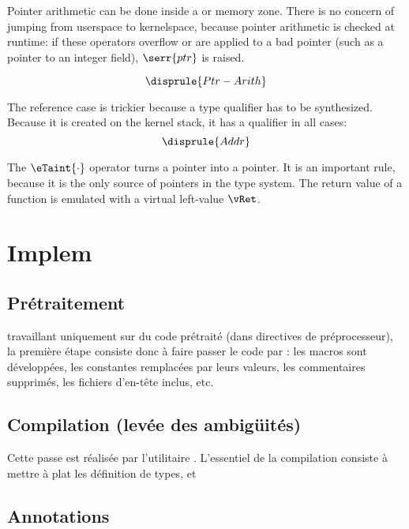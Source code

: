 Pointer arithmetic can be done inside a \qUser or \qKernel memory zone. There is
no concern of jumping from userspace to kernelspace, because pointer arithmetic
is checked at runtime: if these operators overflow or are applied to a bad
pointer (such as a pointer to an integer field), $\serr{ptr}$ is raised.

{\small \[ \disprule{Ptr-Arith} \]}%

The reference case is trickier because a type qualifier has to be synthesized.
Because it is created on the kernel stack, it has a \qKernel qualifier in all
cases:
{\small \[
  \disprule{Addr}
\]}%

The $\eTaint{\cdot}$ operator turns a \qUser pointer into a \qKernel pointer.
It is an important rule, because it is the only source of \qUser pointers in the
type system.
The return value of a function is emulated with a virtual left-value $\vRet$.%
{\small \begin{mathpar}

\end{mathpar}}%

\section{Implem}%

\subsection{Prétraitement}

\ctonewspeak{} travaillant uniquement sur du code prétraité (dans directives de
préprocesseur), la première étape consiste donc à faire passer le code par \cpp:
les macros sont développées, les constantes remplacées par leurs valeurs, les
commentaires supprimés, les fichiers d'en-tête inclus, etc.

\subsection{Compilation (levée des ambigüités)}

Cette passe est réalisée par l'utilitaire \ctonewspeak{}. L'essentiel de la
compilation consiste à mettre à plat les définition de types, et \subsection{Annotations}

